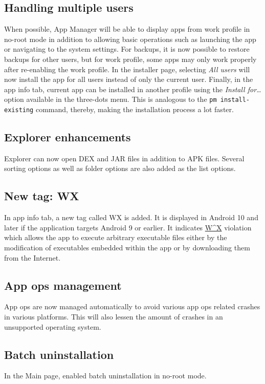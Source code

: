 \subsection{Handling multiple users}
When possible, App Manager will be able to display apps from work profile in no-root mode in addition to allowing basic operations such as launching the app or navigating to the system settings.
For backups, it is now possible to restore backups for other users, but for work profile, some apps may only work properly after re-enabling the work profile.
In the installer page, selecting \textit{All users} will now install the app for all users instead of only the current user.
Finally, in the app info tab, current app can be installed in another profile using the \textit{Install for\dots} option available in the three-dots menu.
This is analogous to the \texttt{pm install-existing} command, thereby, making the installation process a lot faster.

\subsection{Explorer enhancements}
Explorer can now open DEX and JAR files in addition to APK files. Several sorting options as well as folder options are also added as the list options.

\subsection{New tag: WX}
In app info tab, a new tag called WX is added. It is displayed in Android 10 and later if the application targets
Android 9 or earlier. It indicates \href{https://en.wikipedia.org/wiki/W\%5EX}{W\^{}X} violation which allows the app to execute arbitrary executable files either by the modification of executables embedded within the app or by downloading them from the Internet.

\subsection{App ops management}
App ops are now managed automatically to avoid various app ops related crashes in various platforms.
This will also lessen the amount of crashes in an unsupported operating system.

\subsection{Batch uninstallation}
In the Main page, enabled batch uninstallation in no-root mode.

